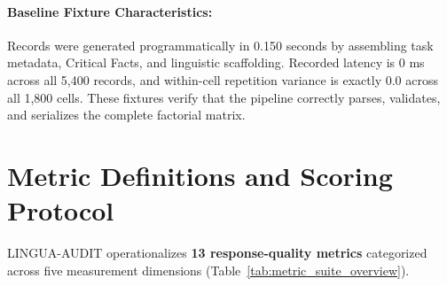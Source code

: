 \documentclass[11pt,a4paper]{article}
\begin{document}
\paragraph{Baseline Fixture Characteristics:} Records were generated programmatically in 0.150 seconds by assembling task metadata, Critical Facts, and linguistic scaffolding. Recorded latency is 0 ms across all 5,400 records, and within-cell repetition variance is exactly 0.0 across all 1,800 cells. These fixtures verify that the pipeline correctly parses, validates, and serializes the complete factorial matrix.

\section{Metric Definitions and Scoring Protocol}
\label{sec:metrics}

LINGUA-AUDIT operationalizes \textbf{13 response-quality metrics} categorized across five measurement dimensions (Table~\ref{tab:metric_suite_overview}).
\end{document}
